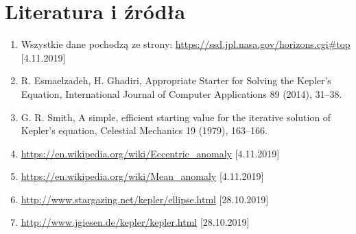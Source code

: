 \documentclass[11pt,wide]{mwart}
\begin{document}
\section*{Literatura i źródła}
\begin{enumerate}[1)]
\item Wszystkie dane pochodzą ze strony: \url{https://ssd.jpl.nasa.gov/horizons.cgi\#top} [4.11.2019]
\item R. Esmaelzadeh, H. Ghadiri, Appropriate Starter for Solving the Kepler’s Equation, International Journal of Computer Applications 89 (2014), 31–38. 
\item G. R. Smith, A simple, efficient starting value for the iterative solution of Kepler’s equation, Celestial Mechanics 19 (1979), 163–166. 
\item \url{https://en.wikipedia.org/wiki/Eccentric_anomaly} [4.11.2019]
\item \url{https://en.wikipedia.org/wiki/Mean_anomaly} [4.11.2019]
\item \url{http://www.stargazing.net/kepler/ellipse.html} [28.10.2019]
\item \url{http://www.jgiesen.de/kepler/kepler.html} [28.10.2019]
\end{enumerate}
\end{document}
